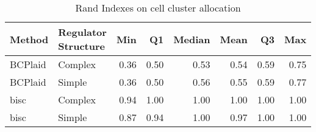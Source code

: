\begin{table}[ht]
\caption{Rand Indexes on cell cluster allocation}
\vspace{1.5cm}
\centering
\begin{tabular}{llrrrrrr}
  \toprule
Method & \makecell{Regulator \\ Structure} & Min & Q1 & Median & Mean & Q3 & Max \\ 
  \midrule
BCPlaid & Complex & 0.36 & 0.50 & 0.53 & 0.54 & 0.59 & 0.75 \\ 
  BCPlaid & Simple & 0.36 & 0.50 & 0.56 & 0.55 & 0.59 & 0.77 \\ 
  bisc & Complex & 0.94 & 1.00 & 1.00 & 1.00 & 1.00 & 1.00 \\ 
  bisc & Simple & 0.87 & 0.94 & 1.00 & 0.97 & 1.00 & 1.00 \\ 
   \bottomrule
\end{tabular}
\end{table}
